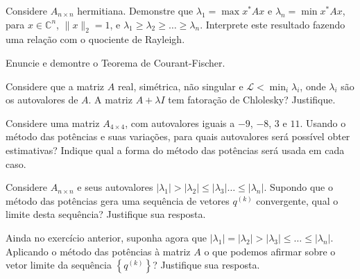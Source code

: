 \begin{questions}
    \question Considere $A_{n \times n}$ hermitiana. Demonstre que $\lambda_1 = \max x^* A x$ e $\lambda_n = \min x^* A x$, para $x \in \mathbb{C}^n$, $\| x \|_2 = 1$, e $\lambda_1 \geq \lambda_2 \geq \ldots \geq \lambda_n$. Interprete este resultado fazendo uma rela\c{c}\~{a}o com o quociente de Rayleigh.
    \begin{solution}
    \end{solution}

     Enuncie e demontre o Teorema de Courant-Fischer.
    \begin{solution}
    \end{solution}

    \question Considere que a matriz $A$ real, sim\'{e}trica, n\~{a}o singular e $\mathcal{L} < \min_i \lambda_i$, onde $\lambda_i$ s\~{a}o os autovalores de $A$. A matriz $A + \lambda I$ tem fatora\c{c}\~{a}o de Chlolesky? Justifique.
    \begin{solution}
    \end{solution}
    
    \question Considere uma matriz $A_{4 \times 4}$, com autovalores iguais a $-9$, $-8$, $3$ e $11$. Usando o m\'{e}todo das pot\^{e}ncias e suas varia\c{c}\~{o}es, para quais autovalores ser\'{a} poss\'{i}vel obter estimativas? Indique qual a forma do m\'{e}todo das pot\^{e}ncias ser\'{a} usada em cada caso.
    \begin{solution}
    \end{solution}

    \question Considere $A_{n \times n}$ e seus autovalores $| \lambda_1 | > | \lambda_2 | \leq | \lambda_3 | \ldots \leq | \lambda_n |$. Supondo que o m\'{e}todo das pot\^{e}ncias gera uma sequ\^{e}ncia de vetores $q^{(k)}$ convergente, qual o limite desta sequ\^{e}ncia? Justifique sua resposta.
    \begin{solution}
    \end{solution}

    \question Ainda no exerc\'{i}cio anterior, suponha agora que $| \lambda_1 | = | \lambda_2 | > | \lambda_3 | \leq \ldots \leq | \lambda_n |$. Aplicando o m\'{e}todo das pot\^{e}ncias \`{a} matriz $A$ o que podemos afirmar sobre o vetor limite da sequ\^{e}ncia $\left\{ q^{(k)} \right\}$? Justifique sua resposta.
    \begin{solution}
    \end{solution}


\end{questions}
